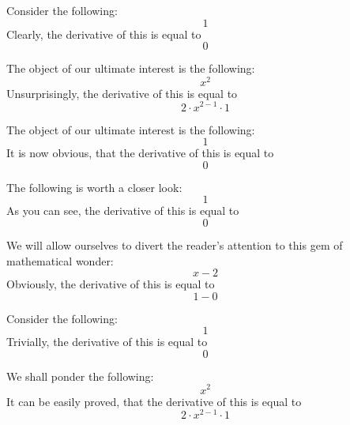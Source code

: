 \documentclass{article}
\begin{document}
Consider the following:
\begin{equation}
1 
\end{equation}
Clearly, the derivative of this is equal to
\begin{equation}
0 
\end{equation}

The object of our ultimate interest is the following:
\begin{equation}
x ^{2 } 
\end{equation}
Unsurprisingly, the derivative of this is equal to
\begin{equation}
2 \cdot x ^{2 - 1 } \cdot 1 
\end{equation}

The object of our ultimate interest is the following:
\begin{equation}
1 
\end{equation}
It is now obvious, that the derivative of this is equal to
\begin{equation}
0 
\end{equation}

The following is worth a closer look:
\begin{equation}
1 
\end{equation}
As you can see, the derivative of this is equal to
\begin{equation}
0 
\end{equation}

We will allow ourselves to divert the reader's attention to this gem of mathematical wonder:
\begin{equation}
x - 2 
\end{equation}
Obviously, the derivative of this is equal to
\begin{equation}
1 - 0 
\end{equation}

Consider the following:
\begin{equation}
1 
\end{equation}
Trivially, the derivative of this is equal to
\begin{equation}
0 
\end{equation}

We shall ponder the following:
\begin{equation}
x ^{2 } 
\end{equation}
It can be easily proved, that the derivative of this is equal to
\begin{equation}
2 \cdot x ^{2 - 1 } \cdot 1 
\end{equation}
\end{document}
